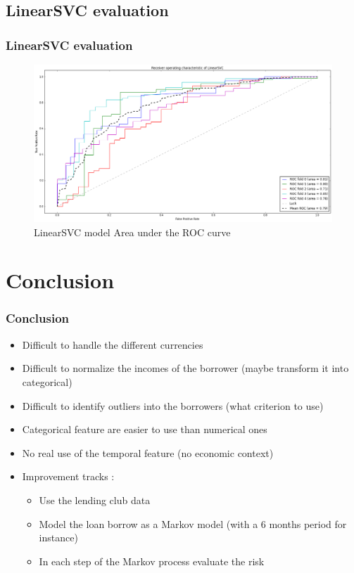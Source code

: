 \documentclass[10pt,handout,english]{beamer}
\begin{document}
		\subsection{LinearSVC evaluation}
		\begin{frame}
		\frametitle{LinearSVC evaluation}
		\begin{figure}[h!]
        	\centering
            \includegraphics[width=\textwidth]{LinearSVC.png}
            \caption{LinearSVC model Area under the ROC curve}
		\end{figure}
		\end{frame}

	\section{Conclusion}
		\begin{frame}
		\frametitle{Conclusion}
			\begin{itemize}
				\item Difficult to handle the different currencies
				\item Difficult to normalize the incomes of the borrower (maybe transform it into categorical)
				\item Difficult to identify outliers into the borrowers (what criterion to use)
				\item Categorical feature are easier to use than numerical ones
				\item No real use of the temporal feature (no economic context)
				\item Improvement tracks :
				\begin{itemize}
					\item Use the lending club data
					\item Model the loan borrow as a Markov model (with a 6 months period for instance)
					\item In each step of the Markov process evaluate the risk
				\end{itemize}
			\end{itemize}
		\end{frame}


	\appendix
	\setcounter{finalframe}{\value{framenumber}}
	\setcounter{framenumber}{\value{finalframe}}
\end{document}
